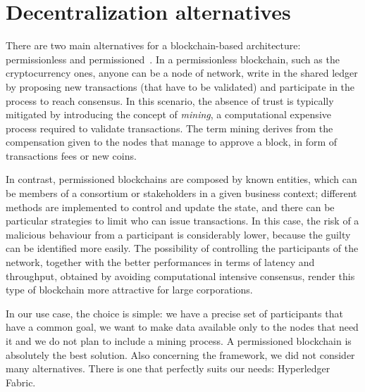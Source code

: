 \section{Decentralization alternatives}
\label{sec:alternatives}
There are two main alternatives for a blockchain-based architecture: permissionless and permissioned~\cite{consensus_protocols}. In a permissionless blockchain, such as the cryptocurrency ones, anyone can be a node of network, write in the shared ledger by proposing new transactions (that have to be validated) and participate in the process to reach consensus. In this scenario, the absence of trust is typically mitigated by introducing the concept of \emph{mining}, a computational expensive process required to validate transactions. The term mining derives from the compensation given to the nodes that manage to approve a block, in form of transactions fees or new coins.

In contrast, permissioned blockchains are composed by known entities, which can be members of a consortium or stakeholders in a given business context; different methods are implemented to control and update the state, and there can be particular strategies to limit who can issue transactions. In this case, the risk of a malicious behaviour from a participant is considerably lower, because the guilty can be identified more easily. The possibility of controlling the participants of the network, together with the better performances in terms of latency and throughput, obtained by avoiding computational intensive consensus, render this type of blockchain more attractive for large corporations.

In our use case, the choice is simple: we have a precise set of participants that have a common goal, we want to make data available only to the nodes that need it and we do not plan to include a mining process. A permissioned blockchain is absolutely the best solution. Also concerning the framework, we did not consider many alternatives. There is one that perfectly suits our needs: Hyperledger Fabric. 

